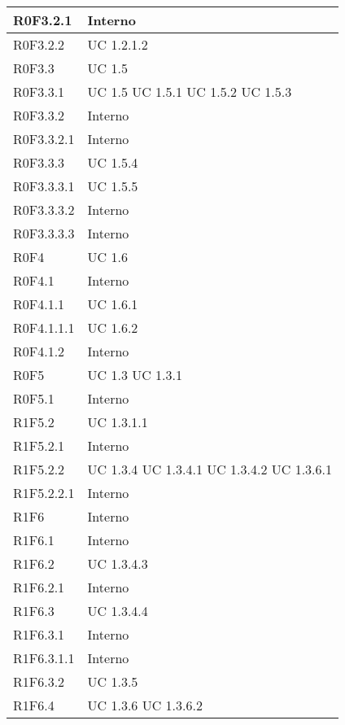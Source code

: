 \begin{center}
\begin{longtable}{| p{4cm} | p{4cm} |}
		\hline
		R0F3.2.1  &  Interno \\
		\hline
		R0F3.2.2  &  UC 1.2.1.2 \\
		\hline
		R0F3.3  &  UC 1.5 \\
		\hline
		R0F3.3.1  &  UC 1.5 \newline UC 1.5.1 \newline UC 1.5.2 \newline UC 1.5.3 \\
		\hline
		R0F3.3.2  &  Interno \\
		\hline
		R0F3.3.2.1  &  Interno \\
		\hline
		R0F3.3.3  &  UC 1.5.4 \\
		\hline
		R0F3.3.3.1  &  UC 1.5.5 \\
		\hline
		R0F3.3.3.2  &  Interno \\
		\hline
		R0F3.3.3.3  &  Interno \\
		\hline
		R0F4  &  UC 1.6 \\
		\hline
		R0F4.1  &  Interno \\
		\hline
		R0F4.1.1  &  UC 1.6.1 \\
		\hline
		R0F4.1.1.1  &  UC 1.6.2 \\
		\hline
		R0F4.1.2  &  Interno \\
		\hline
		R0F5  &  UC 1.3 \newline UC 1.3.1 \\
		\hline
		R0F5.1  &  Interno \\
		\hline
		R1F5.2  &  UC 1.3.1.1 \\
		\hline
		R1F5.2.1  &  Interno \\
		\hline
		R1F5.2.2  &  UC 1.3.4 \newline UC 1.3.4.1 \newline UC 1.3.4.2 \newline UC 1.3.6.1 \\
		\hline
		R1F5.2.2.1  &  Interno \\
		\hline
		R1F6  &  Interno \\
		\hline
		R1F6.1  &  Interno \\
		\hline
		R1F6.2  &  UC 1.3.4.3 \\
		\hline
		R1F6.2.1  &  Interno \\
		\hline
		R1F6.3  &  UC 1.3.4.4 \\
		\hline
		R1F6.3.1  &  Interno \\
		\hline
		R1F6.3.1.1  &  Interno \\
		\hline
		R1F6.3.2  &  UC 1.3.5 \\
		\hline
		R1F6.4  &  UC 1.3.6 \newline UC 1.3.6.2 \\

\end{longtable}
\end{center}
